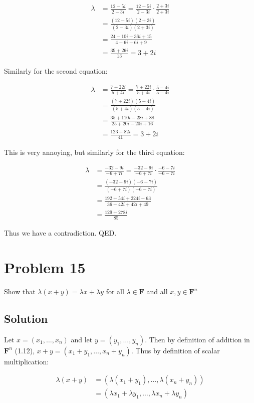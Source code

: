 \documentclass{article}
\begin{document}
\begin{align*}
  \lambda &=\frac{12-5i}{2-3i} = \frac{12-5i}{2-3i}\cdot\frac{2+3i}{2+3i} \\
    &= \frac{(12-5i)(2+3i)}{(2-3i)(2+3i)} \\
    &=\frac{24 - 10i + 36i + 15}{4 -6i + 6i + 9} \\
    &=\frac{39 + 26i}{13}=3+2i
\end{align*}

Similarly for the second equation:

\begin{align*}
  \lambda &=\frac{7+22i}{5+4i} = \frac{7+22i}{5+4i}\cdot\frac{5-4i}{5-4i} \\
    &= \frac{(7+22i)(5-4i)}{(5+4i)(5-4i)} \\
    &=\frac{35 +110i - 28i + 88}{25 + 20i -20i +16} \\
    &=\frac{123 + 82i}{41}=3+2i
\end{align*}

This is very annoying, but similarly for the third equation:

\begin{align*}
  \lambda &=\frac{-32-9i}{-6+7i} = \frac{-32-9i}{-6+7i}\cdot\frac{-6-7i}{-6-7i} \\
    &= \frac{(-32-9i)(-6-7i)}{(-6+7i)(-6-7i)} \\
    &=\frac{192 + 54i + 224i -63}{36 -42i +42i + 49} \\
    &=\frac{129 + 278i}{85}
\end{align*}

Thus we have a contradiction. QED.

\newpage

\section*{Problem 15}

Show that $\lambda(x+y)=\lambda x+\lambda y$ for all $\lambda\in\mathbf{F}$ and all $x, y\in\mathbf{F}^{n}$

\subsection*{Solution}

Let $x=(x_1, \ldots,x_n)$ and let $y=(y_1, \ldots,y_n)$. Then by definition of addition in $\mathbf{F}^{n}$ (1.12), $x+y =(x_{1}+y_{1},\ldots,x_{n}+y_{n})$. Thus by definition of scalar multiplication:

\begin{align*}
\lambda(x+y)&=(\lambda(x_{1}+y_{1}),\ldots,\lambda(x_{n}+y_{n})) \\
&=(\lambda x_1 + \lambda y_1, \ldots, \lambda x_n + \lambda y_n)
\end{align*}
\end{document}

